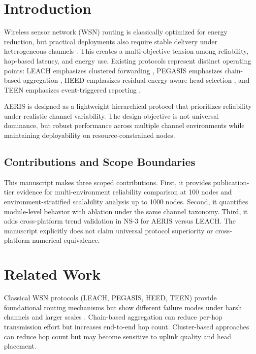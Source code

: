 ﻿\documentclass[sensors,article,submit,moreauthors,pdftex]{Definitions/mdpi}
\begin{document}
\section{Introduction}
Wireless sensor network (WSN) routing is classically optimized for energy reduction, but practical deployments also require stable delivery under heterogeneous channels \cite{Akyildiz2002Survey,Rault2016Energy}. This creates a multi-objective tension among reliability, hop-based latency, and energy use. Existing protocols represent distinct operating points: LEACH emphasizes clustered forwarding \cite{Heinzelman2000LEACH}, PEGASIS emphasizes chain-based aggregation \cite{Lindsey2002PEGASIS}, HEED emphasizes residual-energy-aware head selection \cite{Younis2004HEED}, and TEEN emphasizes event-triggered reporting \cite{Manjeshwar2001TEEN}.

AERIS is designed as a lightweight hierarchical protocol that prioritizes reliability under realistic channel variability. The design objective is not universal dominance, but robust performance across multiple channel environments while maintaining deployability on resource-constrained nodes.

\subsection*{Contributions and Scope Boundaries}
This manuscript makes three scoped contributions. First, it provides publication-tier evidence for multi-environment reliability comparison at 100 nodes and environment-stratified scalability analysis up to 1000 nodes. Second, it quantifies module-level behavior with ablation under the same channel taxonomy. Third, it adds cross-platform trend validation in NS-3 for AERIS versus LEACH. The manuscript explicitly does not claim universal protocol superiority or cross-platform numerical equivalence.

\section{Related Work}
Classical WSN protocols (LEACH, PEGASIS, HEED, TEEN) provide foundational routing mechanisms but show different failure modes under harsh channels and larger scales \cite{Heinzelman2002LEACH,Lindsey2002PEGASIS,Younis2004HEED}. Chain-based aggregation can reduce per-hop transmission effort but increases end-to-end hop count. Cluster-based approaches can reduce hop count but may become sensitive to uplink quality and head placement.
\end{document}
